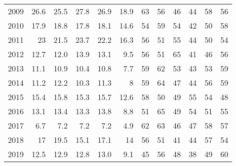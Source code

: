 \documentclass{article}
\begin{document}
\begin{table}[!ht]
\begin{tabular}{l || rrr || rr || cc||cc||cc}
        2009 & 26.6 & \cellcolor{green!25}25.5 & \cellcolor{red!25}27.8 & \cellcolor{red!25}26.9 & 18.9 & \cellcolor{green!25}63 & 56 & \cellcolor{green!25}46 & 44 & \cellcolor{green!25}58 & 56 \\ 
        2010 & 17.9 & \cellcolor{red!25}18.8 & \cellcolor{green!25}17.8 & \cellcolor{red!25}18.1 & 14.6 & 54 & \cellcolor{green!25}59 & \cellcolor{green!25}54 & 42 & 50 & \cellcolor{green!25}58 \\ 
        2011 & 23 & \cellcolor{green!25}21.5 & \cellcolor{red!25}23.7 & \cellcolor{red!25}22.2 & 16.3 & \cellcolor{green!25}56 & 51 & \cellcolor{green!25}55 & 44 & 50 & \cellcolor{green!25}54 \\ 
        2012 & 12.7 & \cellcolor{green!25}12.0 & \cellcolor{red!25}13.9 & \cellcolor{red!25}13.1 & 9.5 & \cellcolor{green!25}56 & 51 & \cellcolor{green!25}65 & 41 & 46 & \cellcolor{green!25}56 \\ 
        2013 & \cellcolor{red!25}11.1 & 10.9 & \cellcolor{green!25}10.4 & \cellcolor{red!25}10.8 & 7.7 & 59 & \cellcolor{green!25}62 & \cellcolor{green!25}53 & 43 & 53 & \cellcolor{green!25}59 \\ 
        2014 & 11.2 & \cellcolor{red!25}12.2 & \cellcolor{green!25}10.3 & \cellcolor{red!25}11.3 & 8 & 59 & \cellcolor{green!25}64 & \cellcolor{green!25}47 & 44 & 56 & \cellcolor{green!25}59 \\ 
        2015 & 15.4 & \cellcolor{red!25}15.8 & \cellcolor{green!25}15.3 & \cellcolor{red!25}15.7 & 12.6 & \cellcolor{green!25}58 & 50 & 49 & \cellcolor{green!25}55 & \cellcolor{green!25}54 & 48 \\ 
        2016 & \cellcolor{green!25}13.1 & \cellcolor{red!25}13.4 & 13.3 & \cellcolor{red!25}13.8 & 8.8 & 51 & \cellcolor{green!25}65 & 49 & \cellcolor{green!25}54 & 51 & \cellcolor{green!25}55 \\ 
        2017 & \cellcolor{green!25}6.7 & \cellcolor{red!25}7.2 & \cellcolor{red!25}7.2 & \cellcolor{red!25}7.2 & 4.9 & 62 & \cellcolor{green!25}63 & 46 & \cellcolor{green!25}47 & \cellcolor{green!25}58 & 57 \\ 
        2018 & 17 & \cellcolor{red!25}19.5 & \cellcolor{green!25}15.1 & \cellcolor{red!25}17.1 & 14 & \cellcolor{green!25}56 & 51 & 41 & \cellcolor{green!25}44 & \cellcolor{green!25}57 & 54 \\ 
        2019 & \cellcolor{green!25}12.5 & \cellcolor{red!25}12.9 & 12.8 & \cellcolor{red!25}13.0 & 9.1 & 45 & \cellcolor{green!25}56 & \cellcolor{green!25}48 & 38 & 49 & \cellcolor{green!25}60 \\ 

\end{tabular}
\end{table}
\end{document}
